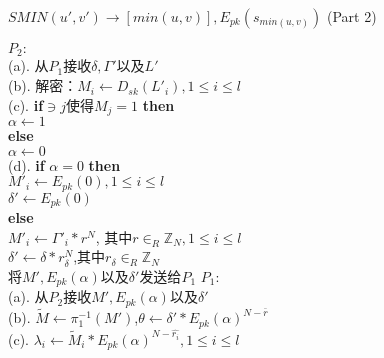 \begin{algorithm}[ht]
\small
\caption*{$SMIN(u',v')\rightarrow [min(u,v)],E_{pk}(s_{min(u,v)})$ (Part 2)}
\begin{algorithmic}[1]
      \State $P_2:$\\
     (a).\hspace{0.1cm} 从$P_1$接收$\delta,\Gamma'$以及$L'$\\
     (b).\hspace{0.1cm} 解密：$M_i \leftarrow D_{sk}(L'_i),1 \leq i \leq l$\\
     (c).\hspace{0.1cm} \textbf{if}$ \ni j$使得$M_j=1$ \textbf{then}\\
      \hspace{1cm} $\alpha \leftarrow 1$\\
     \hspace{0.5cm} \textbf{else}\\
      \hspace{1cm} $\alpha \leftarrow 0$\\
     (d).\hspace{0.1cm} \textbf{if} $\alpha=0$ \textbf{then}\\
     \hspace{1cm} $M'_i \leftarrow E_{pk}(0),1 \leq i \leq l$\\
     \hspace{1cm} $\delta' \leftarrow E_{pk}(0)$\\
     \hspace{0.5cm} \textbf{else}\\
     \hspace{1cm} $M'_i \leftarrow \Gamma'_i * r^N$, 其中$r \in_R \mathbb{Z}_N,1 \leq i \leq l$\\
     \hspace{1cm}  $\delta' \leftarrow \delta * r^N_\delta$,其中$r_\delta \in_R \mathbb{Z}_N$\\
     \hspace{1cm} 将$M',E_{pk}(\alpha)$以及$\delta'$发送给$P_1$
     \State $P_1$:\\
     (a).\hspace{0.1cm} 从$P_2$接收$M',E_{pk}(\alpha)$以及$\delta'$\\
     (b). \hspace{0.1cm} $\tilde{M} \leftarrow \pi^{-1}_1(M')$,$\theta \leftarrow \delta'*E_{pk}(\alpha)^{N-\bar{r}}$\\
     (c). \hspace{0.1cm} $\lambda_i \leftarrow \tilde{M}_i * E_{pk}(\alpha)^{N-\hat{r_i}},1 \leq i \leq l$\\

\end{algorithmic}
\end{algorithm}
